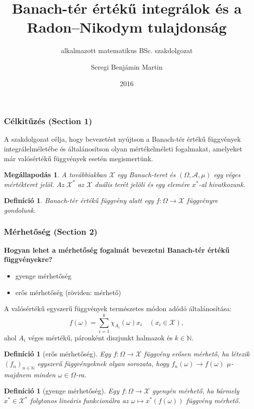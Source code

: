 \documentclass[handout]{beamer} %
\title{Banach-tér értékű integrálok és a Radon\---Nikodym tulajdonság}
\subtitle{alkalmazott matematikus BSc. szakdolgozat}
\author{Seregi Benjámin Martin}
\institute{Eötvös Loránd Tudományegyetem}
\date{2016}
\newtheorem{defi}[lem]{Definíció}
\newtheorem{megall}[lem]{Megállapodás}
\begin{document}
\frame{\titlepage}
\begin{frame}
\frametitle{Célkitűzés (Section 1)}
\justifying
A szakdolgozat célja, hogy bevezetést nyújtson a Banach-tér értékű függvények integrálelméletébe és általánosítson olyan mértékelméleti fogalmakat, amelyeket már valósértékű függvények esetén megismertünk.
\begin{megall}
A továbbiakban $\mathcal{X}$ egy Banach-teret és $(\Omega, \mathcal{A}, \mu)$ egy véges mértékteret jelöl. Az $\mathcal{X}^*$ az $\mathcal{X}$ duális terét jelöli és egy elemére $x^*$-al hivatkozunk.
\end{megall}
\begin{defi}
Banach-tér értékű függvény alatt egy  $f \colon \Omega \to \mathcal{X}$ függvényre gondolunk.
\end{defi}
\end{frame}

\begin{frame}
\frametitle{Mérhetőség (Section 2)}
\justifying
\textbf{Hogyan lehet a mérhetőség fogalmát bevezetni Banach-tér értékű függvényekre?}
\begin{itemize}
\item gyenge mérhetőség
\item erős mérhetőség (röviden: mérhető)
\end{itemize}
\end{frame}

\begin{frame}
A valósértékű egyszerű függvények természetes módon adódó általánosítása:
$$f(\omega) = \sum^k_{i=1} \chi_{A_i}(\omega)x_i \quad (x_i \in \mathcal{X}),$$
ahol $A_i$ véges mértékű, páronként diszjunkt halmazok és $k \in \mathbb{N}$.
\begin{defi}[erős mérhetőség] Egy $f \colon \Omega \to \mathcal{X}$ függvény erősen mérhető, ha létezik $(f_n)_{n \in \mathbb{N}}$ egyszerű függvényeknek olyan sorozata, hogy $f_n(\omega) \to f(\omega)$ $\mu$-majdnem minden $\omega \in \Omega$-ra.
\end{defi}
\begin{defi}[gyenge mérhetőség] Egy $f \colon \Omega \to \mathcal{X}$ gyengén mérhető, ha bármely $x^* \in \mathcal{X}^*$ folytonos lineáris funkcionálra az $\omega \mapsto x^*(f(\omega))$ függvény mérhető.
\end{defi}
\end{frame}
\end{document}
